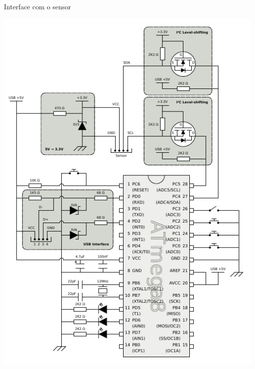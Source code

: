 \documentclass{beamer}
\begin{document}
\begin{frame}{Interface com o sensor}
	\begin{center}
		\includegraphics[keepaspectratio, width=1.0\textwidth, height=0.8\textheight, clip, viewport=0.00in 2.15in 3.33in 4.60in]{../monografia/img/AVR-magnetometer-usb-mouse.pdf}
	\end{center}
\end{frame}
\end{document}

